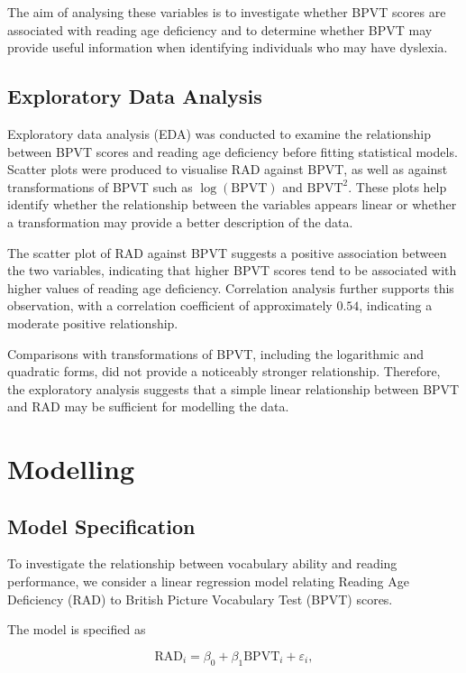 \documentclass[11pt, a4paper]{article}
\begin{document}
The aim of analysing these variables is to investigate whether BPVT scores are associated with reading age deficiency and to determine whether BPVT may provide useful information when identifying individuals who may have dyslexia.

\subsection*{Exploratory Data Analysis}

Exploratory data analysis (EDA) was conducted to examine the relationship between BPVT scores and reading age deficiency before fitting statistical models. Scatter plots were produced to visualise RAD against BPVT, as well as against transformations of BPVT such as $\log(\text{BPVT})$ and $\text{BPVT}^2$. These plots help identify whether the relationship between the variables appears linear or whether a transformation may provide a better description of the data.

The scatter plot of RAD against BPVT suggests a positive association between the two variables, indicating that higher BPVT scores tend to be associated with higher values of reading age deficiency. Correlation analysis further supports this observation, with a correlation coefficient of approximately $0.54$, indicating a moderate positive relationship.

Comparisons with transformations of BPVT, including the logarithmic and quadratic forms, did not provide a noticeably stronger relationship. Therefore, the exploratory analysis suggests that a simple linear relationship between BPVT and RAD may be sufficient for modelling the data.

\section{Modelling} \label{sec:models}

\subsection{Model Specification}
To investigate the relationship between vocabulary ability and reading performance, we consider a linear regression model relating Reading Age Deficiency (RAD) to British Picture Vocabulary Test (BPVT) scores.

The model is specified as

\begin{equation}
\text{RAD}_i = \beta_0 + \beta_1 \text{BPVT}_i + \varepsilon_i,
\end{equation}
\end{document}
